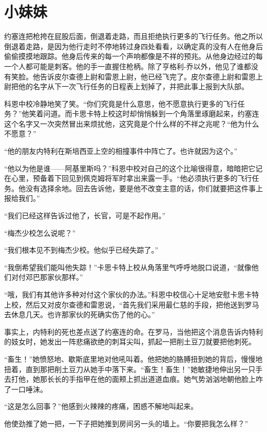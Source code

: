 \chapter{小妹妹}
 
    约塞连把枪挎在屁股后面，倒退着走路，而且拒绝执行更多的飞行任务。他之所以倒退着走路，是因为他行走时不停地转过身四处看看，以确定真的没有人在他身后偷偷摸摸地跟踪。他身后传来的每一个声响都像是不祥的预兆。从他身边经过的每一个人都可能是刺客。他的手一直握住枪柄。除了亨格利-乔以外，他见了谁都没有笑脸。他告诉皮尔查德上尉和雷恩上尉，他已经飞完了。皮尔查德上尉和雷恩上尉把他的名字从下一次飞行任务的日程表上划掉了，并把此事上报到大队部。

    科恩中校冷静地笑了笑。“你们究竟是什么意思，他不愿意执行更多的飞行任务？”他笑着问道。而卡思卡特上校这时却悄悄躲到一个角落里琢磨起来，约塞连这个名字又一次突然冒出来烦扰他，这究竟是个什么样的不祥之兆呢？“他为什么不愿意？”

    “他的朋友内特利在斯培西亚上空的相撞事件中阵亡了。也许就因为这个。”

    “他以为他是谁——阿基里斯吗？”科恩中校对自己的这个比喻很得意，暗暗把它记在心里，预备着下回见到佩克姆将军时拿出来露一手。“他必须执行更多的飞行任务。他没有选择余地。回去告诉他，要是他不改变主意的话，你们就要把这件事上报给我们。”

    “我们已经这样告诉过他了，长官，可是不起作用。”

    “梅杰少校怎么说呢？”

    “我们根本见不到梅杰少校。他似乎已经失踪了。”

    “我倒希望我们能叫他失踪！”卡思卡特上校从角落里气呼呼地脱口说道，“就像他们对付邓巴那家伙那样。”

    “哦，我们有其他许多种对付这个家伙的办法。”科恩中校信心十足地安慰卡思卡特上校，然后又对皮尔查德和雷恩说，“首先我们采用最仁慈的手段，把他送到罗马去休息几天。也许那家伙的死确实伤了他的心。”

    事实上，内特利的死也差点送了约塞连的命。在罗马，当他把这个消息告诉内特利的妓女时，她发出一阵悲痛欲绝的刺耳尖叫，抓起一把削土豆刀就要把他刺死。

 


    “畜生！”她愤怒地、歇斯底里地对他吼叫着。他把她的胳膊扭到她的背后，慢慢地扭着，直到那把削土豆刀从她手中落下来。“畜生！畜生！”她敏捷地伸出另一只手去打他，她那长长的手指甲在他的面颊上抓出道道血痕。她气势汹汹地朝他脸上咋了一口唾沫。

    “这是怎么回事？”他感到火辣辣的疼痛，困惑不解地叫起来。

    他使劲推了她一把，一下子把她推到房间另一头的墙上。“你要把我怎么样？”

